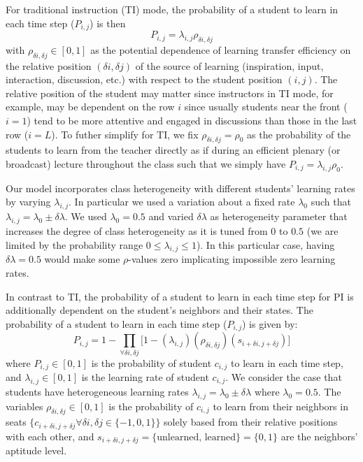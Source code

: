 \documentclass[twocolumn,secnumarabic,amssymb, nobibnotes, aps, prd]{revtex4-2}
\begin{document}

    For traditional instruction (TI) mode, the probability of a student to learn in each time step ($P_{i,j}$) is then
    \begin{equation}
        P_{i,j} = \lambda_{i,j}\rho_{\delta i,\delta j}
    \end{equation}
    with $\rho_{\delta i,\delta j}\in[0,1]$ as the potential dependence of learning transfer efficiency on the relative position $(\delta i, \delta j)$ of the source of learning (inspiration, input, interaction, discussion, etc.) with respect to the student position $(i,j)$.
    The relative position of the student may matter since instructors in TI mode, for example, may be dependent on the row $i$ since usually students near the front ($i=1$) tend to be more attentive and engaged in discussions than those in the last row ($i=L$).
    To futher simplify for TI, we fix $\rho_{\delta i,\delta j}=\rho_{0}$ as the probability of the students to learn from the teacher directly as if during an efficient plenary (or broadcast) lecture throughout the class such that we simply have $P_{i,j} = \lambda_{i,j}\rho_0$.

    Our model incorporates class heterogeneity with different students' learning rates by varying $\lambda_{i,j}$.
    In particular we used a variation about a fixed rate $\lambda_0$ such that $\lambda_{i,j}=\lambda_0 \pm \delta\lambda$.
    We used $\lambda_0=0.5$ and varied $\delta\lambda$ as heterogeneity parameter that increases the degree of class heterogeneity as it is tuned from $0$ to $0.5$ (we are limited by the probability range ${0}\leq\lambda_{i,j}\leq{1}$).
    In this particular case, having $\delta\lambda=0.5$ would make some $\rho$-values zero implicating impossible zero learning rates.
    

    In contrast to TI, the probability of a student to learn in each time step for PI is additionally dependent on the student's neighbors and their states. The probability of a student to learn in each time step ($P_{i,j}$) is given by:
    \begin{equation} 
        \label{eq:BPCA PI learning probability}
            P_{i,j} = 1 - \prod_{\forall \delta i, \delta j}{\lbrack1-(\lambda_{i,j})(\rho_{\delta i, \delta j})(s_{i+\delta i, j+\delta j})}\rbrack
    \end{equation}
    where
    $P_{i,j} \in [0,1]$ is the probability of student $c_{i,j}$ to learn in each time step, and
    $\lambda_{i,j} \in  [0,1]$ is the learning rate of student $c_{i,j}$.
    We consider the case that students have heterogeneous learning rates $\lambda_{i,j}=\lambda_0 \pm \delta\lambda$ where $\lambda_0=0.5$.
    The variables $\rho_{\delta i, \delta j} \in [0,1]$ is the probability of $c_{i,j}$ to learn from their neighbors in seats $\lbrace c_{i+\delta i, j+\delta j} \forall \delta i, \delta j \in \lbrace -1,0,1 \rbrace \rbrace$ solely based from their relative positions with each other, and
    $s_{i+\delta i, j+\delta j} = \lbrace\text{unlearned, learned}\rbrace=\lbrace 0,1 \rbrace$ are the neighbors' aptitude level.
    
\end{document}

